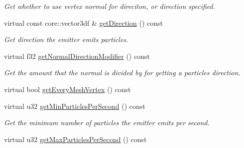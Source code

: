 \begin{DoxyCompactItemize}
\begin{DoxyCompactList}\small\item\em Get whether to use vertex normal for direciton, or direction specified. \end{DoxyCompactList}\item 
\hypertarget{classirr_1_1scene_1_1_c_particle_mesh_emitter_a6950c0c99e877a79e0b4897803f25347}{virtual const core\-::vector3df \& \hyperlink{classirr_1_1scene_1_1_c_particle_mesh_emitter_a6950c0c99e877a79e0b4897803f25347}{get\-Direction} () const }\label{classirr_1_1scene_1_1_c_particle_mesh_emitter_a6950c0c99e877a79e0b4897803f25347}

\begin{DoxyCompactList}\small\item\em Get direction the emitter emits particles. \end{DoxyCompactList}\item 
\hypertarget{classirr_1_1scene_1_1_c_particle_mesh_emitter_a82105ca7335a8142084479c34513e41c}{virtual f32 \hyperlink{classirr_1_1scene_1_1_c_particle_mesh_emitter_a82105ca7335a8142084479c34513e41c}{get\-Normal\-Direction\-Modifier} () const }\label{classirr_1_1scene_1_1_c_particle_mesh_emitter_a82105ca7335a8142084479c34513e41c}

\begin{DoxyCompactList}\small\item\em Get the amount that the normal is divided by for getting a particles direction. \end{DoxyCompactList}\item 
virtual bool \hyperlink{classirr_1_1scene_1_1_c_particle_mesh_emitter_acff1520f8bb670f1195b7685fd738627}{get\-Every\-Mesh\-Vertex} () const 
\item 
\hypertarget{classirr_1_1scene_1_1_c_particle_mesh_emitter_a91d6acf24b273d74d187a2dd246f5a7c}{virtual u32 \hyperlink{classirr_1_1scene_1_1_c_particle_mesh_emitter_a91d6acf24b273d74d187a2dd246f5a7c}{get\-Min\-Particles\-Per\-Second} () const }\label{classirr_1_1scene_1_1_c_particle_mesh_emitter_a91d6acf24b273d74d187a2dd246f5a7c}

\begin{DoxyCompactList}\small\item\em Get the minimum number of particles the emitter emits per second. \end{DoxyCompactList}\item 
\hypertarget{classirr_1_1scene_1_1_c_particle_mesh_emitter_a34f4343170b3bedd87263b974967fe70}{virtual u32 \hyperlink{classirr_1_1scene_1_1_c_particle_mesh_emitter_a34f4343170b3bedd87263b974967fe70}{get\-Max\-Particles\-Per\-Second} () const }\label{classirr_1_1scene_1_1_c_particle_mesh_emitter_a34f4343170b3bedd87263b974967fe70}


\end{DoxyCompactItemize}
